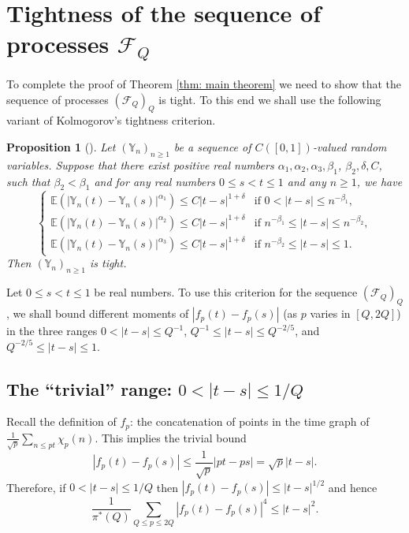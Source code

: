 \documentclass[JEP,XML,SOM,Unicode,NoFloatCountersInSection,published]{cedram}
\theoremstyle{plain}
\newtheorem{pro}[thm]{Proposition}
\theoremstyle{definition}
\newcommand{\Y}{\mathbb{Y}}
\newcommand{\ex}{\mathbb{E}}
\begin{document}
\section{Tightness of the sequence of processes \texorpdfstring{$\mathcal{F}_Q$}{FQ}}\label{s: Tighness}

To complete the proof of Theorem \ref{thm: main theorem} we need to show that the sequence of processes $(\mathcal{F}_{Q})_Q$ is tight. To this end we shall use the following variant of Kolmogorov's tightness criterion.

\begin{pro}[{\cite[Prop.\,B.11.11]{Ko}}] Let $(\Y_n)_{n\geq 1}$ be a sequence of $C([0,1])$-valued random variables. Suppose that there exist positive real numbers $\alpha_1, \alpha_2, \alpha_3, \beta_1$, $\beta_2, \delta, C$, such that $\beta_2<\beta_1$ and
for any real numbers $0\leq s<t\leq 1$ and any $n\geq 1$, we have
\[
\begin{cases}
\ex(|\Y_n(t)-\Y_n(s)|^{\alpha_1})\leq C|t-s|^{1+\delta} & \text{if } 0< |t-s|\leq n^{-\beta_1}, \\
\ex(|\Y_n(t)-\Y_n(s)|^{\alpha_2})\leq C|t-s|^{1+\delta} & \text{if } n^{-\beta_1}\leq |t-s|\leq n^{-\beta_2}, \\
\ex(|\Y_n(t)-\Y_n(s)|^{\alpha_3})\leq C|t-s|^{1+\delta} & \text{if } n^{-\beta_2}\leq |t-s|\leq 1.
\end{cases}
\]
Then $(\Y_n)_{n\geq 1}$ is tight.
\end{pro}

Let $0\leq s<t\leq 1$ be real numbers. To use this criterion for the sequence $(\mathcal{F}_{Q})_Q$, we shall bound different moments of $|f_p(t)-f_p(s)|$ (as $p$ varies in $[Q, 2Q]$) in the three ranges $0< |t-s|\leq Q^{-1}$, $Q^{-1}\leq |t-s|\leq Q^{-2/5}$, and $ Q^{-2/5}\leq |t-s|\leq 1.$

\subsection{The ``trivial'' range: $0< |t-s|\leq 1/Q$}
Recall the definition of $f_p$: the concatenation of points in the time graph of $\frac{1}{\sqrt{p}} \sum_{n \leq pt} \chi_p(n)$. This implies the trivial bound
\[
|f_p(t) - f_p(s)| \leq \frac{1}{\sqrt{p}}|pt - ps| = \sqrt{p}|t-s|.
\]
Therefore, if $0<|t-s|\leq 1/Q$ then $|f_p(t) - f_p(s)|\leq |t-s|^{1/2}$ and hence
\begin{equation}\label{FirstRangeTS}
\frac{1}{\pi^*(Q)}\sum_{Q\leq p\leq 2Q}
|f_p(t)-f_p(s)|^4 \leq |t-s|^2.
\end{equation}
\end{document}
